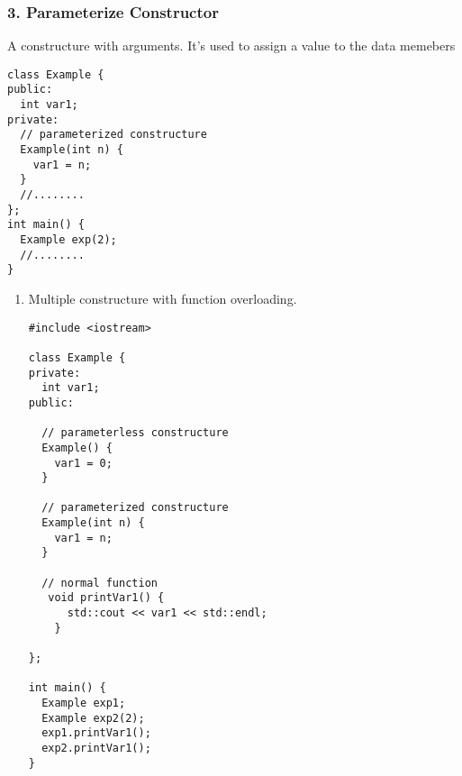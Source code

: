 \documentclass[11pt]{article}
\begin{document}
\subsubsection{3. Parameterize Constructor}
\label{sec:orgd96217c}
A constructure with arguments. It's used to assign a value to the data memebers
\begin{verbatim}
class Example {
public:
  int var1;
private:
  // parameterized constructure
  Example(int n) {
    var1 = n;
  }
  //........
};
int main() {
  Example exp(2);
  //........
}
\end{verbatim}
\begin{enumerate}
\item Multiple constructure with function overloading.
\label{sec:orgd199d47}
\begin{verbatim}
#include <iostream>

class Example {
private:
  int var1;
public:

  // parameterless constructure
  Example() {
    var1 = 0;
  }

  // parameterized constructure
  Example(int n) {
    var1 = n;
  }

  // normal function
   void printVar1() {
      std::cout << var1 << std::endl;
    }

};

int main() {
  Example exp1;
  Example exp2(2);
  exp1.printVar1();
  exp2.printVar1();
}
\end{verbatim}
\end{enumerate}
\end{document}

